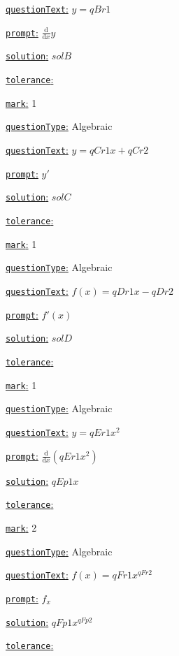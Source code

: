 \documentclass[preview]{standalone}
\newcommand \fieldname[1]{\underline{\texttt{#1}:}}
\begin{document}
\fieldname{questionText}
$y = {qBr1}$

\fieldname{prompt}
$\frac{\textrm{d}}{\textrm{d}x}y$

\fieldname{solution}
${solB}$

\fieldname{tolerance}


\fieldname{mark}
1

\fieldname{questionType}
Algebraic

\fieldname{questionText}
$y = {qCr1}x+{qCr2}$

\fieldname{prompt}
$y'$

\fieldname{solution}
${solC}$

\fieldname{tolerance}


\fieldname{mark}
1

\fieldname{questionType}
Algebraic

\fieldname{questionText}
$f(x) = {qDr1}x-{qDr2}$

\fieldname{prompt}
$f'(x)$

\fieldname{solution}
${solD}$

\fieldname{tolerance}


\fieldname{mark}
1

\fieldname{questionType}
Algebraic

\fieldname{questionText}
$y = {qEr1}x^2$

\fieldname{prompt}
$\frac{\textrm{d}}{\textrm{d}x}({qEr1}x^2)$

\fieldname{solution}
${qEp1}x$

\fieldname{tolerance}


\fieldname{mark}
2

\fieldname{questionType}
Algebraic

\fieldname{questionText}
$f(x)={qFr1}x^{qFr2}$

\fieldname{prompt}
$f_x$

\fieldname{solution}
${qFp1}x^{qFp2}$

\fieldname{tolerance}
\end{document}
